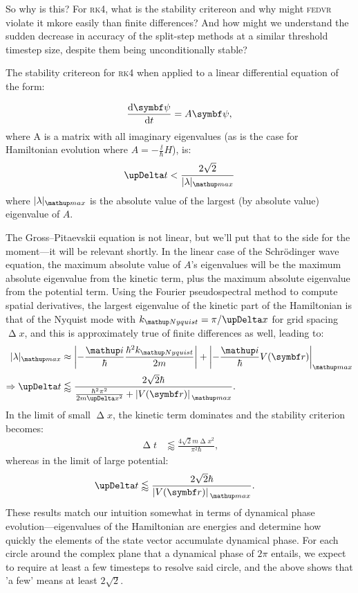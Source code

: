 So why is this? For \textsc{rk4}, what is the stability critereon and why might \textsc{fedvr} violate it mkore easily than finite differences? And how might we understand the sudden decrease in accuracy of the split-step methods at a similar threshold timestep size, despite them being unconditionally stable?

The stability critereon for \textsc{rk4} when applied to a linear differential equation of the form:

\begin{align}
\dv{\vec\psi}{t} = A\vec\psi,
\end{align}
where A is a matrix with all imaginary eigenvalues (as is the case for Hamiltonian evolution where $A=-\frac \ii \hbar H$), is\cite{caplan_numerical_2011-1}:
\begin{align}
\upDelta t < \frac{2 \sqrt 2}{|\lambda|_\up {max}}
\end{align}
where $|\lambda|_\up {max}$ is the absolute value of the largest (by absolute value) eigenvalue of $A$.

The Gross--Pitaevskii equation is not linear, but we'll put that to the side for the moment---it will be relevant shortly. In the linear case of the Schr\"odinger wave equation, the maximum absolute value of $A$'s eigenvalues will be the maximum absolute eigenvalue from the kinetic term, plus the maximum absolute eigenvalue from the potential term. Using the Fourier pseudospectral method to compute spatial derivatives, the largest eigenvalue of the kinetic part of the Hamiltonian is that of the Nyquist mode with $k_\up{Nyquist} = \pi / \upDelta x$ for grid spacing $\upDelta x$, and this is approximately true of finite differences as well, leading to:
\begin{align}
|\lambda|_\up {max} &\approx \Abs{-\frac \ii \hbar \frac{\hbar^2 k_\up{Nyquist}}{2m}}
+ \Abs{-\frac \ii \hbar V(\vec r)}_\up{max}\\
\Rightarrow \upDelta t &\lessapprox \frac{2\sqrt 2 \hbar}
{\frac{\hbar^2\pi^2}{2m \upDelta x^2} + \abs{V(\vec r)}_\up{max}}.
\end{align}
In the limit of small $\upDelta x$, the kinetic term dominates and the stability criterion becomes:
\begin{align}
\upDelta t &\lessapprox \frac{4\sqrt 2 m \upDelta x^2}{\pi^2 \hbar},
\end{align}
whereas in the limit of large potential:
\begin{align}
\upDelta t &\lessapprox \frac{2\sqrt 2\hbar}{\abs{V(\vec r)}_\up{max}}.
\end{align}
These results match our intuition somewhat in terms of dynamical phase evolution---eigenvalues of the Hamiltonian are energies and determine how quickly the elements of the state vector accumulate dynamical phase. For each circle around the complex plane that a dynamical phase of $2\pi$ entails, we expect to require at least a few timesteps to resolve said circle, and the above shows that 'a few' means at least $2\sqrt{2}$.

